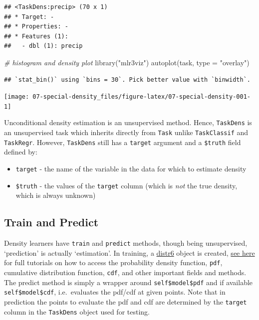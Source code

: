 \documentclass[
]{scrbook}
\newenvironment{Shaded}{\begin{snugshade}}{\end{snugshade}}
\newcommand{\AttributeTok}[1]{\textcolor[rgb]{0.77,0.63,0.00}{#1}}
\newcommand{\CommentTok}[1]{\textcolor[rgb]{0.56,0.35,0.01}{\textit{#1}}}
\newcommand{\FunctionTok}[1]{\textcolor[rgb]{0.00,0.00,0.00}{#1}}
\newcommand{\NormalTok}[1]{#1}
\newcommand{\StringTok}[1]{\textcolor[rgb]{0.31,0.60,0.02}{#1}}
\providecommand{\tightlist}{%
  \setlength{\itemsep}{0pt}\setlength{\parskip}{0pt}}
\renewenvironment{Shaded} {\begin{snugshade}\small} {\end{snugshade}}
\begin{document}
\begin{verbatim}
## <TaskDens:precip> (70 x 1)
## * Target: -
## * Properties: -
## * Features (1):
##   - dbl (1): precip
\end{verbatim}

\begin{Shaded}
\begin{Highlighting}[]
\CommentTok{\# histogram and density plot}
\FunctionTok{library}\NormalTok{(}\StringTok{"mlr3viz"}\NormalTok{)}
\FunctionTok{autoplot}\NormalTok{(task, }\AttributeTok{type =} \StringTok{"overlay"}\NormalTok{)}
\end{Highlighting}
\end{Shaded}

\begin{verbatim}
## `stat_bin()` using `bins = 30`. Pick better value with `binwidth`.
\end{verbatim}

\begin{center}\texttt{[image: 07-special-density\_files/figure-latex/07-special-density-001-1]} \end{center}

Unconditional density estimation is an unsupervised method.
Hence, \texttt{TaskDens} is an unsupervised task which inherits directly from \texttt{Task} unlike \texttt{TaskClassif} and \texttt{TaskRegr}.
However, \texttt{TaskDens} still has a \texttt{target} argument and a \texttt{\$truth} field defined by:

\begin{itemize}
\tightlist
\item
  \texttt{target} - the name of the variable in the data for which to estimate density
\item
  \texttt{\$truth} - the values of the \texttt{target} column (which is \emph{not} the true density, which is always unknown)
\end{itemize}

\hypertarget{train-and-predict-1}{%
\subsection{Train and Predict}\label{train-and-predict-1}}

Density learners have \texttt{train} and \texttt{predict} methods, though being unsupervised, `prediction' is actually `estimation'.
In training, a \href{https://cran.r-project.org/package=distr6}{distr6} object is created,
\href{https://alan-turing-institute.github.io/distr6/}{see here} for full tutorials on how to access the probability density function, \texttt{pdf}, cumulative distribution function, \texttt{cdf}, and other important fields and methods.
The predict method is simply a wrapper around \texttt{self\$model\$pdf} and if available \texttt{self\$model\$cdf}, i.e.~evaluates the pdf/cdf at given points.
Note that in prediction the points to evaluate the pdf and cdf are determined by the \texttt{target} column in the \texttt{TaskDens} object used for testing.
\end{document}
